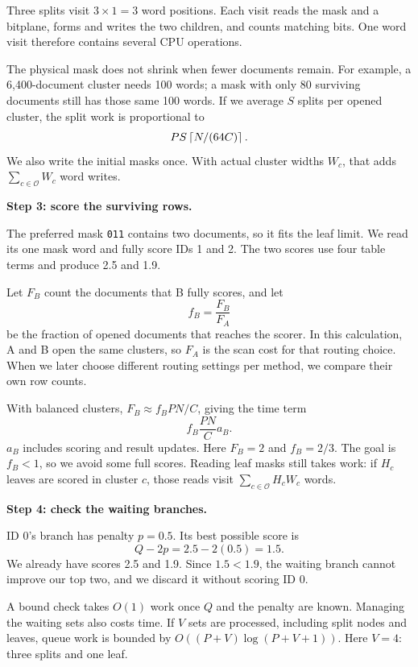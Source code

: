 Three splits visit $3\times1=3$ word positions. Each visit reads the mask and a bitplane, forms and writes the two children, and counts matching bits. One word visit therefore contains several CPU operations.

The physical mask does not shrink when fewer documents remain. For example, a 6,400-document cluster needs 100 words; a mask with only 80 surviving documents still has those same 100 words. If we average $S$ splits per opened cluster, the split work is proportional to
\[
 PS\left\lceil N/(64C)\right\rceil.
\]
We also write the initial masks once. With actual cluster widths $W_c$, that adds $\sum_{c\in\mathcal O}W_c$ word writes.

\textbf{Step 3: score the surviving rows.}\par
The preferred mask \texttt{011} contains two documents, so it fits the leaf limit. We read its one mask word and fully score IDs 1 and 2. The two scores use four table terms and produce 2.5 and 1.9.

Let $F_B$ count the documents that B fully scores, and let
\[
 f_B=\frac{F_B}{F_A}
\]
be the fraction of opened documents that reaches the scorer. In this calculation, A and B open the same clusters, so $F_A$ is the scan cost for that routing choice. When we later choose different routing settings per method, we compare their own row counts.

With balanced clusters, $F_B\approx f_BPN/C$, giving the time term
\[
 f_B\frac{PN}{C}a_B.
\]
$a_B$ includes scoring and result updates. Here $F_B=2$ and $f_B=2/3$. The goal is $f_B<1$, so we avoid some full scores. Reading leaf masks still takes work: if $H_c$ leaves are scored in cluster $c$, those reads visit $\sum_{c\in\mathcal O}H_cW_c$ words.

\textbf{Step 4: check the waiting branches.}\par
ID 0's branch has penalty $p=0.5$. Its best possible score is
\[
 Q-2p=2.5-2(0.5)=1.5.
\]
We already have scores 2.5 and 1.9. Since $1.5<1.9$, the waiting branch cannot improve our top two, and we discard it without scoring ID 0.
\begin{center}
\end{center}
A bound check takes $O(1)$ work once $Q$ and the penalty are known. Managing the waiting sets also costs time. If $V$ sets are processed, including split nodes and leaves, queue work is bounded by $O((P+V)\log(P+V+1))$. Here $V=4$: three splits and one leaf.

